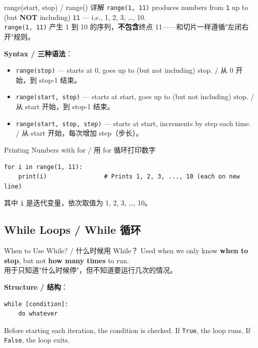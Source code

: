 \documentclass[11pt,a4paper]{report}
\let\oldtexttt\texttt
\renewcommand{\texttt}[1]{\textcolor{mainblue}{\oldtexttt{#1}}}
\begin{document}
\begin{concept}{range(start, stop) / range() 详解}
    \texttt{range(1, 11)} produces numbers from \texttt{1} up to (but \textbf{NOT} including) \texttt{11} — i.e., 1, 2, 3, …, 10. \\
    \texttt{range(1, 11)} 产生 1 到 10 的序列，\textbf{不包含}终点 11——和切片一样遵循"左闭右开"规则。

    \textbf{Syntax / 三种语法}：
    \begin{itemize}[itemsep=0.3em]
        \item \texttt{range(stop)} — starts at 0, goes up to (but not including) stop. / 从 0 开始，到 stop-1 结束。
        \item \texttt{range(start, stop)} — starts at start, goes up to (but not including) stop. / 从 start 开始，到 stop-1 结束。
        \item \texttt{range(start, stop, step)} — starts at start, increments by step each time. / 从 start 开始，每次增加 step（步长）。
    \end{itemize}
\end{concept}

\begin{examplebox}{Printing Numbers with for / 用 for 循环打印数字}
\begin{lstlisting}
for i in range(1, 11):
    print(i)                # Prints 1, 2, 3, ..., 10 (each on new line)
\end{lstlisting}
    其中 \texttt{i} 是迭代变量，依次取值为 1, 2, 3, …, 10。
\end{examplebox}

\subsection{While Loops / While 循环}

\begin{concept}{When to Use While? / 什么时候用 While？}
    Used when we only know \textbf{when to stop}, but not \textbf{how many times} to run. \\
    用于只知道"什么时候停"，但不知道要运行几次的情况。

    \textbf{Structure / 结构}：
    \begin{lstlisting}
while [condition]:
    do whatever
    \end{lstlisting}
    Before starting each iteration, the condition is checked. If \texttt{True}, the loop runs. If \texttt{False}, the loop exits.
\end{concept}
\end{document}

